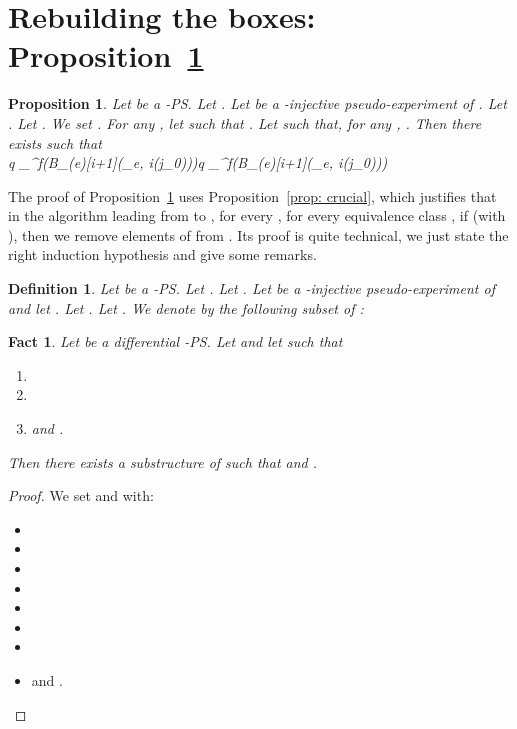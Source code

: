 \documentclass{article}
\theoremstyle{plain}
\newtheorem{definition}{Definition}
\newtheorem{prop}[theorem]{Proposition}
\newtheorem{fact}[theorem]{Fact}
\newcommand{\taylor}[2]{\mathcal{T}(#1)[#2]}
\newcommand{\cod}{\oc}
\newcommand{\conclusionscirc}[1]{\mathcal{P}_\circ^{\textsf{f}}(#1)}
\newcommand{\conclusionsnotcirc}[1]{\mathcal{P}_\bullet^{\textsf{f}}(#1)}
\begin{document}
\section{Rebuilding the boxes: Proposition~\ref{prop: rebuilding boxes}}\label{appendix: rebuilding boxes}


\begin{prop}\label{prop: rebuilding boxes}
Let  be a -PS. Let . 
Let  be a -injective pseudo-experiment of . Let . Let . 
We set . 
For any , let  such that   . 
Let  such that, 
for any ,    . 
Then there exists     such that 
\\ q \in \conclusionscirc{B_{\taylor{e}{i+1}}(\cod_{e, i}(j_0))}q \in \conclusionsnotcirc{B_{\taylor{e}{i+1}}(\cod_{e, i}(j_0))}
\end{prop}


The proof of Proposition~\ref{prop: rebuilding boxes} uses Proposition~\ref{prop: crucial}, which justifies that in the algorithm leading from  to , for every , for every equivalence class , if  (with ), then we remove  elements of  from . Its proof is quite technical, we just state the right induction hypothesis and give some remarks. 

\begin{definition}
Let  be a -PS. Let . Let . Let  be a -injective pseudo-experiment of  and let . Let . Let . We denote by  the following subset of : 

\end{definition}



\begin{fact}\label{fact: adequate_extended}
Let  be a differential -PS. Let  and let  such that
\begin{enumerate} 
\item 
\item 
\item and .
\end{enumerate}
Then there exists a substructure  of  such that  and .
\end{fact}

\begin{proof}
We set  and  with:
\begin{itemize}
\item 
\item 
\item 
\item 
\item 
\item 
\item 
\item and .
\end{itemize}
\end{proof}
\end{document}
